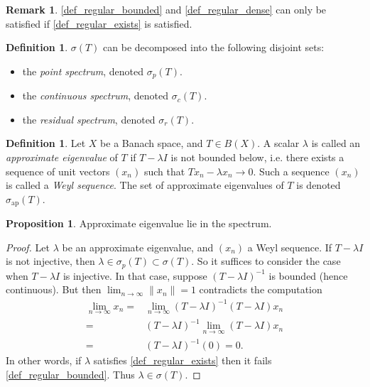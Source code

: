 \documentclass{dcthesis}
\numberwithin{equation}{section}
\numberwithin{equation}{section}
\theoremstyle{definition}
\newtheorem{proposition}[equation]{Proposition}
\newtheorem{definition}[equation]{Definition}
\newtheorem{remark}[equation]{Remark}
\begin{document}
\begin{remark}
	\ref{def_regular_bounded} and \ref{def_regular_dense} can only be satisfied if \ref{def_regular_exists} is satisfied.
\end{remark}

\begin{definition}
	$\sigma(T)$ can be decomposed into the following disjoint sets:
	\begin{itemize}
		\item the \emph{point spectrum}, denoted $\sigma_p(T)$.
		\item the \emph{continuous spectrum}, denoted $\sigma_c(T)$.
		\item the \emph{residual spectrum}, denoted $\sigma_r(T)$.
	\end{itemize}
\end{definition}

\begin{definition} %
	Let $X$ be a Banach space, and $T\in B(X)$. A scalar $\lambda$ is called an \emph{approximate eigenvalue} of $T$ if $T-\lambda I$ is not bounded below, i.e. there exists a sequence of unit vectors $(x_n)$ such that $Tx_n-\lambda x_n \to 0$. Such a sequence $(x_n)$ is called a \emph{Weyl sequence}. The set of approximate eigenvalues of $T$ is denoted $\sigma_{\text{ap}}(T)$.
\end{definition}

\begin{proposition}
	Approximate eigenvalue lie in the spectrum. 
\end{proposition}
\begin{proof}
	Let $\lambda$ be an approximate eigenvalue, and $(x_n)$ a Weyl sequence. If $T-\lambda I$ is not injective, then $\lambda\in\sigma_p(T)\subset\sigma(T)$. So it suffices to consider the case when $T-\lambda I$ is injective. In that case, suppose $(T-\lambda I)^{-1}$ is bounded (hence continuous). But then $\lim_{n\to\infty} \|x_n\| = 1$ contradicts the computation
	\begin{align*}
		\lim_{n\to\infty} x_n 
		=& \lim_{n\to\infty} (T-\lambda I)^{-1}(T-\lambda I)x_n \\
		=& (T-\lambda I)^{-1}\lim_{n\to\infty} (T-\lambda I)x_n \\
		=& (T - \lambda I)^{-1} (0) = 0.
	\end{align*}
	In other words, if $\lambda$ satisfies \ref{def_regular_exists} then it fails \ref{def_regular_bounded}. Thus $\lambda\in\sigma(T)$.
\end{proof}
\end{document}
